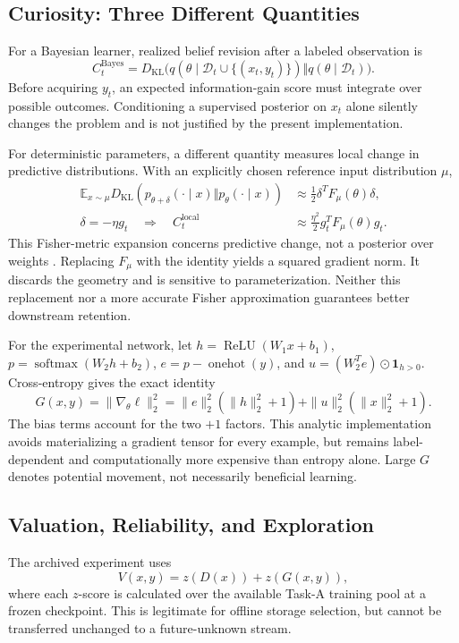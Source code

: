\documentclass[conference]{IEEEtran}
\newcommand{\E}{\mathbb{E}}
\newcommand{\KL}{D_{\mathrm{KL}}}
\begin{document}
\subsection{Curiosity: Three Different Quantities}
For a Bayesian learner, realized belief revision after a labeled observation is
\begin{equation}
 C_t^{\mathrm{Bayes}}=\KL\big(q(\theta\mid\mathcal D_t\cup\{(x_t,y_t)\})
 \Vert q(\theta\mid\mathcal D_t)\big).
\end{equation}
Before acquiring $y_t$, an expected information-gain score must integrate over possible outcomes. Conditioning a supervised posterior on $x_t$ alone silently changes the problem and is not justified by the present implementation.

For deterministic parameters, a different quantity measures local change in predictive distributions. With an explicitly chosen reference input distribution $\mu$,
\begin{align}
 \E_{x\sim\mu}\KL(p_{\theta+\delta}(\cdot\mid x)\Vert p_\theta(\cdot\mid x))
 &\approx\tfrac12\delta^T F_\mu(\theta)\delta,\\
 \delta=-\eta g_t\quad\Longrightarrow\quad C_t^{\mathrm{local}}
 &\approx\tfrac{\eta^2}{2}g_t^T F_\mu(\theta)g_t.
\end{align}
This Fisher-metric expansion concerns predictive change, not a posterior over weights \cite{amari}. Replacing $F_\mu$ with the identity yields a squared gradient norm. It discards the geometry and is sensitive to parameterization. Neither this replacement nor a more accurate Fisher approximation guarantees better downstream retention.

For the experimental network, let $h=\operatorname{ReLU}(W_1x+b_1)$, $p=\operatorname{softmax}(W_2h+b_2)$, $e=p-\operatorname{onehot}(y)$, and $u=(W_2^Te)\odot\mathbf1_{h>0}$. Cross-entropy gives the exact identity
\begin{equation}
 \label{eq:gradient}G(x,y)=\|\nabla_\theta\ell\|_2^2
 =\|e\|_2^2(\|h\|_2^2+1)+\|u\|_2^2(\|x\|_2^2+1).
\end{equation}
The bias terms account for the two $+1$ factors. This analytic implementation avoids materializing a gradient tensor for every example, but remains label-dependent and computationally more expensive than entropy alone. Large $G$ denotes potential movement, not necessarily beneficial learning.

\subsection{Valuation, Reliability, and Exploration}
The archived experiment uses
\begin{equation}
 \label{eq:offline}V(x,y)=z(D(x))+z(G(x,y)),
\end{equation}
where each $z$-score is calculated over the available Task-A training pool at a frozen checkpoint. This is legitimate for offline storage selection, but cannot be transferred unchanged to a future-unknown stream.
\end{document}
